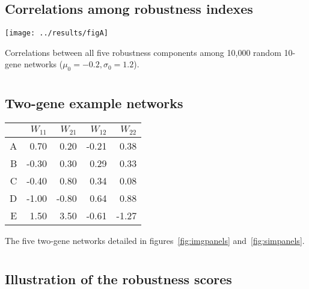 \documentclass{article}
\begin{document}
\begin{appendices}
  \setcounter{section}{0}
  \renewcommand{\thesection}{\arabic{section}}

  \clearpage
  \section{}
    \label{supp:fullcorr}
    \subsection*{Correlations among robustness indexes}

	\texttt{[image: ../results/figA]}
	
	Correlations between all five robustness components among 10,000 random 10-gene networks ($\mu_0=-0.2, \sigma_0=1.2$). 



  \clearpage
  \section{}
    \label{supp:W}
    \subsection*{Two-gene example networks}

	\begin{center}
	\begin{tabular}{rrrrr}
	  \hline
	 & $W_{11}$ & $W_{21}$ & $W_{12}$ & $W_{22}$ \\ 
	  \hline
	  A & 0.70 & 0.20 & -0.21 & 0.38 \\ 
	  B & -0.30 & 0.30 & 0.29 & 0.33 \\ 
	  C & -0.40 & 0.80 & 0.34 & 0.08 \\ 
	  D & -1.00 & -0.80 & 0.64 & 0.88 \\ 
	  E & 1.50 & 3.50 & -0.61 & -1.27 \\ 
	   \hline
	\end{tabular}
	\end{center}
	
	The five two-gene networks detailed in figures~\ref{fig:imgpanels} and~\ref{fig:simpanels}.


  \clearpage
  \section{}
    \label{supp:simpanels}
    \subsection*{Illustration of the robustness scores}


\end{appendices}
\end{document}
